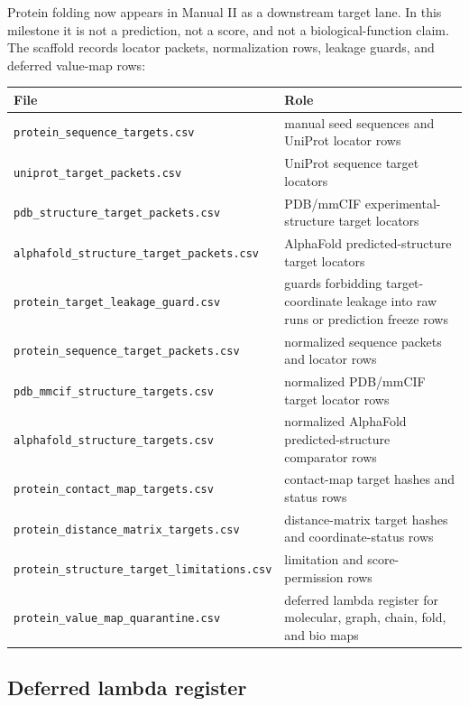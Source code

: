 Protein folding now appears in Manual II as a downstream target lane. In this milestone it is not a prediction, not a score, and not a biological-function claim. The scaffold records locator packets, normalization rows, leakage guards, and deferred value-map rows:
\begin{center}
\begin{tabularx}{\linewidth}{@{}lX@{}}
\toprule
File & Role \\
\midrule
\texttt{protein\_sequence\_targets.csv} & manual seed sequences and UniProt locator rows \\
\texttt{uniprot\_target\_packets.csv} & UniProt sequence target locators \\
\texttt{pdb\_structure\_target\_packets.csv} & PDB/mmCIF experimental-structure target locators \\
\texttt{alphafold\_structure\_target\_packets.csv} & AlphaFold predicted-structure target locators \\
\texttt{protein\_target\_leakage\_guard.csv} & guards forbidding target-coordinate leakage into raw runs or prediction freeze rows \\

\texttt{protein\_sequence\_target\_packets.csv} & normalized sequence packets and locator rows \\
\texttt{pdb\_mmcif\_structure\_targets.csv} & normalized PDB/mmCIF target locator rows \\
\texttt{alphafold\_structure\_targets.csv} & normalized AlphaFold predicted-structure comparator rows \\
\texttt{protein\_contact\_map\_targets.csv} & contact-map target hashes and status rows \\
\texttt{protein\_distance\_matrix\_targets.csv} & distance-matrix target hashes and coordinate-status rows \\
\texttt{protein\_structure\_target\_limitations.csv} & limitation and score-permission rows \\
\texttt{protein\_value\_map\_quarantine.csv} & deferred lambda register for molecular, graph, chain, fold, and bio maps \\
\bottomrule
\end{tabularx}
\end{center}

\subsection{Deferred lambda register}


